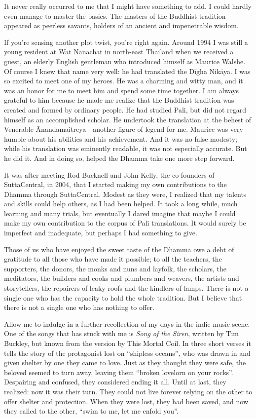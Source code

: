 \documentclass[12pt,openany]{book}%
\begin{document}
It never really occurred to me that I might have something to add. I could hardly even manage to master the basics. The masters of the Buddhist tradition appeared as peerless savants, holders of an ancient and impenetrable wisdom.

If you’re sensing another plot twist, you’re right again. Around 1994 I was still a young resident at Wat Nanachat in north-east Thailand when we received a guest, an elderly English gentleman who introduced himself as Maurice Walshe. Of course I knew that name very well: he had translated the \textsanskrit{Dīgha} \textsanskrit{Nikāya}. I was so excited to meet one of my heroes. He was a charming and witty man, and it was an honor for me to meet him and spend some time together. I am always grateful to him because he made me realize that the Buddhist tradition was created and formed by ordinary people. He had studied Pali, but did not regard himself as an accomplished scholar. He undertook the translation at the behest of Venerable Ānandamaitreya—another figure of legend for me. Maurice was very humble about his abilities and his achievement. And it was no false modesty; while his translation was eminently readable, it was not especially accurate. But he did it. And in doing so, helped the Dhamma take one more step forward.

It was after meeting Rod Bucknell and John Kelly, the co-founders of SuttaCentral, in 2004, that I started making my own contributions to the Dhamma through SuttaCentral. Modest as they were, I realized that my talents and skills could help others, as I had been helped. It took a long while, much learning and many trials, but eventually I dared imagine that maybe I could make my own contribution to the corpus of Pali translations. It would surely be imperfect and inadequate, but perhaps I had something to give.

Those of us who have enjoyed the sweet taste of the Dhamma owe a debt of gratitude to all those who have made it possible; to all the teachers, the supporters, the donors, the monks and nuns and layfolk, the scholars, the meditators, the builders and cooks and plumbers and weavers, the artists and storytellers, the repairers of leaky roofs and the kindlers of lamps. There is not a single one who has the capacity to hold the whole tradition. But I believe that there is not a single one who has nothing to offer.

Allow me to indulge in a further recollection of my days in the indie music scene. One of the songs that has stuck with me is \textit{Song of the Siren}, written by Tim Buckley, but known from the version by This Mortal Coil. In three short verses it tells the story of the protagonist lost on “shipless oceans”, who was drawn in and given shelter by one they came to love. Just as they thought they were safe, the beloved seemed to turn away, leaving them “broken lovelorn on your rocks”. Despairing and confused, they considered ending it all. Until at last, they realized: now it was their turn. They could not live forever relying on the other to offer shelter and protection. When they were lost, they had been saved, and now they called to the other, “swim to me, let me enfold you”.
\end{document}
